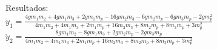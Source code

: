 \documentclass[11pt, spanish, a4paper, twoside]{article}
\begin{document}
\begin{enumerate}
\begin{minipage}[t][10cm]{0.65\textwidth}
\begin{enumerate}
		Resultados:\\
		$\ddot{y}_{1} = \frac{4 g m_{1} m_{2} + 4 g m_{1} m_{3} + 2 g m_{1} m_{p} - 16 g m_{2} m_{3} - 6 g m_{2} m_{p} - 6 g m_{3} m_{p} - 2 g m_{p}^{2}}{4 m_{1} m_{2} + 4 m_{1} m_{3} + 2 m_{1} m_{p} + 16 m_{2} m_{3} + 8 m_{2} m_{p} + 8 m_{3} m_{p} + 3 m_{p}^{2}}$\\
		$\ddot{y}_{2} = \frac{8 g m_{1} m_{2} - 8 g m_{1} m_{3} + 2 g m_{2} m_{p} - 2 g m_{3} m_{p}}{4 m_{1} m_{2} + 4 m_{1} m_{3} + 2 m_{1} m_{p} + 16 m_{2} m_{3} + 8 m_{2} m_{p} + 8 m_{3} m_{p} + 3 m_{p}^{2}}$\\
	\end{enumerate}
\end{minipage}
\begin{minipage}[c][0cm][t]{0.3\textwidth}

\end{minipage}
\end{enumerate}
\end{document}
